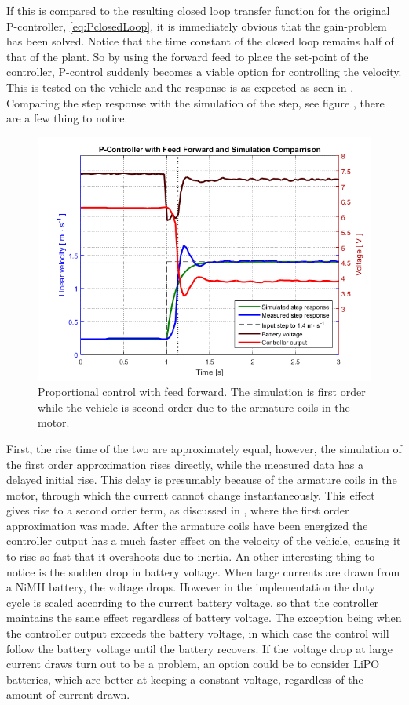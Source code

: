 %
If this is compared to the resulting closed loop transfer function for the original P-controller, \eqref{eq:PclosedLoop}, it is immediately obvious that the gain-problem has been solved. Notice that the time constant of the closed loop remains half of that of the plant. So by using the forward feed to place the set-point of the controller, P-control suddenly becomes a viable option for controlling the velocity. This is tested on the vehicle and the response is as expected as seen in . Comparing the step response with the simulation of the step, see figure , there are a few thing to notice.
%
\begin{figure}[H]
 	\centering
 	\includegraphics[width=.8\textwidth]{figures/stepPfeedForward}
 	\caption{Proportional control with feed forward. The simulation is first order while the vehicle is second order due to the armature coils in the motor.}
 	\label{fig:stepPfeedForward}
\end{figure}
%
First, the rise time of the two are approximately equal, however, the simulation of the first order approximation rises directly, while the measured data has a delayed initial rise. This delay is presumably because of the armature coils in the motor, through which the current cannot change instantaneously. This effect gives rise to a second order term, as discussed in , where the first order approximation was made. After the armature coils have been energized the controller output has a much faster effect on the velocity of the vehicle, causing it to rise so fast that it overshoots due to inertia.
An other interesting thing to notice is the sudden drop in battery voltage. When large currents are drawn from a NiMH battery, the voltage drops\cite{BatteryDS}. However in the implementation the duty cycle is scaled according to the current battery voltage, so that the controller maintains the same effect regardless of battery voltage. The exception being when the controller output exceeds the battery voltage, in which case the control will follow the battery voltage until the battery recovers. If the voltage drop at large current draws turn out to be a problem, an option could be to consider LiPO batteries, which are better at keeping a constant voltage, regardless of the amount of current drawn.

